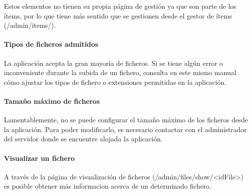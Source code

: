 \documentclass[
]{article}
\begin{document}
Estos elementos no tienen su propia página de gestión ya que son parte
de los ítems, por lo que tiene más sentido que se gestionen desde el
gestor de ítems ({/admin/items/}).

\hypertarget{tipos-de-ficheros-admitidos}{%
\paragraph{Tipos de ficheros
admitidos}\label{tipos-de-ficheros-admitidos}}

La aplicación acepta la gran mayoría de ficheros. Si se tiene algún
error o inconveniente durante la subida de un fichero, consulta en este
mismo manual cómo ajustar los tipos de fichero o extensiones permitidas
en la aplicación.

\hypertarget{tamauxf1o-muxe1ximo-de-ficheros}{%
\paragraph{Tamaño máximo de
ficheros}\label{tamauxf1o-muxe1ximo-de-ficheros}}

Lamentablemente, no se puede configurar el tamaño máximo de los ficheros
desde la aplicación. Para poder modificarlo, es necesario contactar con
el administrador del servidor donde se encuentre alojada la aplicación.

\hypertarget{visualizar-un-fichero}{%
\paragraph{Visualizar un fichero}\label{visualizar-un-fichero}}

A través de la página de visualización de ficheros
({/admin/files/show/\textless idFile\textgreater{}}) es posible obtener
más informacion acerca de un determinado fichero.
\end{document}
